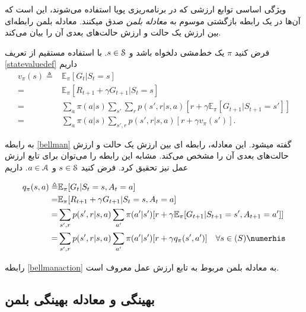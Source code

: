 ویژگی اساسی توابع ارزشی که در برنامه‌ریزی پویا استفاده می‌شوند،  این است که آن‌ها در یک رابطه بازگشتی موسوم به 
\textit{معادله بلمن} 
صدق می\nf کنند. معادله بلمن رابطه‌ای بین ارزش یک حالت و ارزش‌ حالت‌های بعدی آن را بیان می‌کند.

فرض کنید $\pi$ یک خط‌مشی دلخواه باشد و
 $s \in \EuScript{S}$.
  با استفاده مستقیم از تعریف
 \ref{statevaluedef}
 داریم
\begin{align}
v_\pi (s) \triangleq& \mathbb{E}_\pi [G_t | S_t = s] \nonumber \\
=& \mathbb{E}_\pi [R_{t+1}+ \gamma G_{t+1}|S_t=s] \nonumber \\
=&\sum_{a} \pi(a|s) \sum_{s'}\sum_{r} p(s',r|s,a)[r+\gamma \mathbb{E}_\pi[G_{t+1}|S_{t+1}=s']] \nonumber\\
=&\sum_{a} \pi(a|s) \sum_{s',r} p(s',r|s,a)[r+\gamma v_\pi(s')] %
\label{bellman}.
\end{align}

به رابطه 
 \ref{bellman}
 گفته می\nf شود. این معادله، رابطه ای بین ارزش یک حالت و ارزش حالت‌های بعدی آن را مشخص می‌کند. مشابه این رابطه را می‌توان برای تابع ارزش عمل نیز تحقیق کرد. فرض کنید 
$s \in \EuScript{S}$
 و 
 $a \in \EuScript{A}$.
 داریم
 
\begin{align}
q_\pi (s,a) \triangleq& \mathbb{E}_\pi [G_t | S_t = s, A_t = a] \nonumber \\
=& \mathbb{E}_\pi [R_{t+1}+ \gamma G_{t+1}|S_t=s, A_t = a] \nonumber \\
=&\sum_{s',r} p(s',r|s,a) \sum_{a'} \pi(a'|s')[r+\gamma \mathbb{E}_\pi[G_{t+1}|S_{t+1}=s', A_{t+1} = a']] \nonumber\\
=&\sum_{s',r}  p(s',r|s,a) \sum_{a'} \pi(a'|s')[r+\gamma q_\pi(s',a')] \quad \forall s \in \mathbb(S) \numerhis 
\label{bellmanaction}
\end{align}

رابطه \ref{bellmanaction} به معادله بلمن مربوط به تابع ارزش عمل معروف است.
\subsection{بهینگی و معادله بهینگی بلمن}

